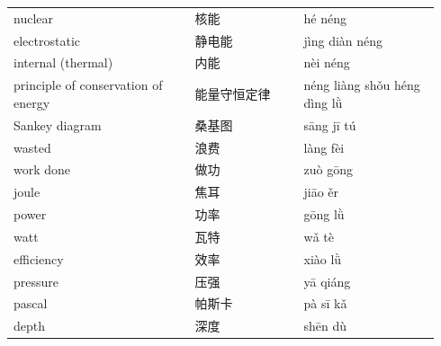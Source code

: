 \documentclass[11pt]{article}
\begin{document}
\begin{longtable}{@{}p{0.40\linewidth}p{0.24\linewidth}p{0.30\linewidth}@{}}
nuclear & 核能 & hé néng \\
electrostatic & 静电能 & jìng diàn néng \\
internal (thermal) & 内能 & nèi néng \\
principle of conservation of energy & 能量守恒定律 & néng liàng shǒu héng dìng lǜ \\
Sankey diagram & 桑基图 & sāng jī tú \\
wasted & 浪费 & làng fèi \\
work done & 做功 & zuò gōng \\
joule & 焦耳 & jiāo ěr \\
power & 功率 & gōng lǜ \\
watt & 瓦特 & wǎ tè \\
efficiency & 效率 & xiào lǜ \\
pressure & 压强 & yā qiáng \\
pascal & 帕斯卡 & pà sī kǎ \\
depth & 深度 & shēn dù \\
\end{longtable}
\end{document}
